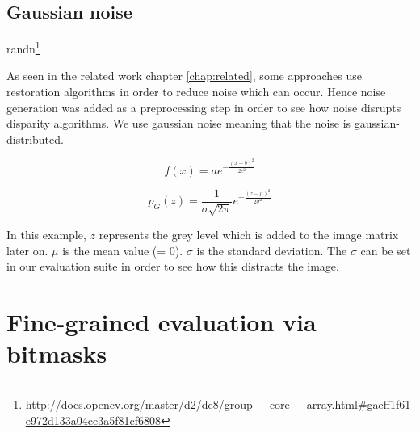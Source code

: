 \subsection*{Gaussian noise}

randn\footnote{\url{http://docs.opencv.org/master/d2/de8/group__core__array.html\#gaeff1f61e972d133a04ce3a5f81cf6808}}


\citep{opencv_library}

As seen in the related work chapter \ref{chap:related}, some approaches use restoration algorithms in order to reduce noise which can occur.
Hence noise generation was added as a preprocessing step in order to see how noise disrupts disparity algorithms.
We use gaussian noise meaning that the noise is gaussian-distributed.

$$f\left(x\right) = a e^{- { \frac{(x-b)^2 }{ 2 c^2} } }$$

$$p_G(z) = \frac{1}{\sigma\sqrt{2\pi}} e^{ -\frac{(z-\mu)^2}{2\sigma^2} }$$

\noindent In this example, $z$ represents the grey level which is added to the image matrix later on.
$\mu$ is the mean value (= 0).
$\sigma$ is the standard deviation.
\newline\newline\noindent The $\sigma$ can be set in our evaluation suite in order to see how this distracts the image.


\begin{figure}[h!]
\center
{}
\end{figure}

\section{Fine-grained evaluation via bitmasks}

